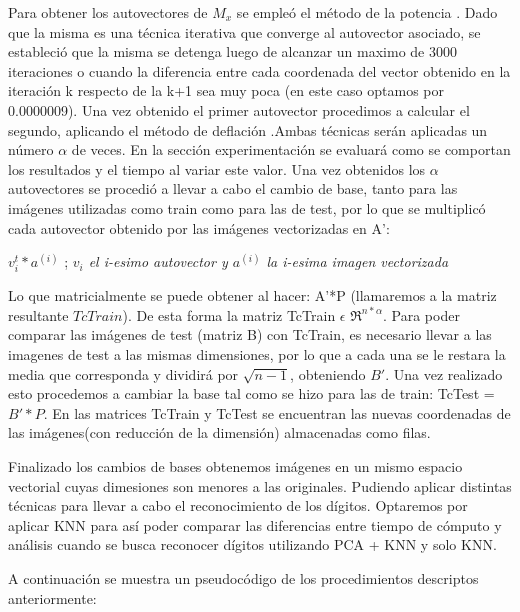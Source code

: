  Para obtener los autovectores de $M_x$ se empleó el método de la potencia %
. Dado que la misma es una técnica iterativa que converge al autovector asociado, se estableció que la misma se detenga luego de alcanzar un maximo de 3000 iteraciones o cuando la diferencia entre cada coordenada del vector obtenido en la iteración k respecto de la k+1 sea muy poca (en este caso optamos por 0.0000009). Una vez obtenido el primer autovector procedimos a calcular el segundo, aplicando el método de deflación %
.Ambas técnicas serán aplicadas un número $\alpha$ de veces. En la sección experimentación se evaluará como se comportan los resultados y el tiempo al variar este valor.
Una vez obtenidos los $\alpha$ autovectores se procedió a llevar a cabo el cambio de base, tanto para las imágenes utilizadas como train como para las de test, por lo que se multiplicó cada autovector obtenido por las imágenes vectorizadas en A': \newline

$v_i^{t}*a^{(i)}$ ; \textit{$v_i$ el i-esimo autovector y $a^{(i)}$ la i-esima imagen vectorizada} \newline

Lo que matricialmente se puede obtener al hacer: A'*P (llamaremos a la matriz resultante $TcTrain$). De esta forma la matriz TcTrain $\epsilon$ $\Re^{n*\alpha}$. Para poder comparar las imágenes de test (matriz B) con TcTrain, es necesario llevar a las imagenes de test a las mismas dimensiones, por lo que a cada una se le restara la media que corresponda y dividirá por $\sqrt{n-1}$, obteniendo $ B'$. 
Una vez realizado esto procedemos a cambiar la base tal como se hizo para las de train:\newline
 TcTest = $B'*P$. En las matrices TcTrain y TcTest se encuentran las nuevas coordenadas de las imágenes(con reducción de la dimensión) almacenadas como filas.
 

 Finalizado los cambios de bases obtenemos imágenes en un mismo espacio vectorial cuyas dimesiones son menores a las originales. Pudiendo aplicar distintas técnicas para llevar a cabo el reconocimiento de los dígitos. Optaremos por aplicar KNN para así poder comparar las diferencias entre tiempo de cómputo y análisis cuando se busca reconocer dígitos utilizando PCA + KNN y solo KNN.
 
A continuación se muestra un pseudocódigo de los procedimientos descriptos anteriormente:

